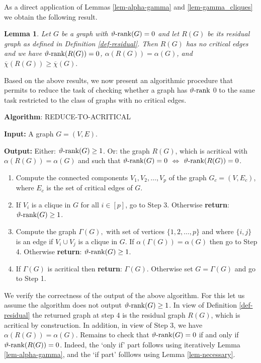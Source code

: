 \documentclass[11pt]{article}
\newtheorem{lemma}[theorem]{Lemma}
\numberwithin{equation}{section}
\newcommand{\rrank}{\vartheta\text{\rm -rank}}
\begin{document}
As a direct application of Lemmas \ref{lem-alpha-gamma} and \ref{lem-gamma_cliques} we obtain the following result.

\begin{lemma}\label{lem-residual}
Let $G$ be a graph with $\rrank(G)=0$ and let $R(G)$ be its residual graph as defined in Definition \ref{def-residual}. Then $R(G)$ has no critical edges and we have
$\rrank(R(G))=0$, $\alpha(R(G))=\alpha(G)$, and $\overline{\chi}(R(G))\geq \overline{\chi}(G).$
\end{lemma}

Based on the above  results,  we now present an algorithmic procedure that permits to reduce the task of checking whether a graph has $\rrank$ 0 to the same task restricted to the class of graphs with no critical edges. 

\medskip\noindent
\textbf{Algorithm}: REDUCE-TO-ACRITICAL

\smallskip\noindent
\textbf{Input:} A graph $G=(V,E)$.

\smallskip\noindent
\textbf{Output:} 
Either: $\rrank (G)\ge 1$. 
Or: the graph $R(G)$, which is acritical with $\alpha (R(G))= \alpha(G)$ and such that 
$\rrank (G)=0$ $\Longleftrightarrow$ $\rrank (R(G))=0$.
\begin{enumerate}
    \item Compute the connected components $V_1, V_2, \dots, V_p$ of the graph $G_c=(V,E_c)$, where $E_c$ is the set of critical edges of $G$. 
    \item If $V_i$ is a clique in $G$ for all $i\in [p]$, go to Step 3. Otherwise \textbf{return}:  $\rrank (G)\ge 1$.
    \item Compute the graph $\Gamma(G),$ with  set of vertices $\{1,2,\dots,p\}$ and where $\{i,j\}$ is an edge if $V_i\cup V_j$ is a clique in $G$. If 
    $\alpha(\Gamma(G))= \alpha(G)$ then go to Step 4. Otherwise  \textbf{return}: $\rrank (G) \ge 1$.
    \item If $\Gamma(G)$ is acritical then  \textbf{return}: $\Gamma(G)$.
    Otherwise  set $G=\Gamma(G)$ and go to Step 1. 
\end{enumerate}

We  verify the correctness of the output of the above algorithm. For this let us  assume the algorithm does not output $\rrank (G)\ge 1$.
In view of Definition \ref{def-residual}  the returned graph at step 4 is the residual graph $R(G)$, which is acritical by construction. In addition, in view of Step 3, we have $\alpha(R(G))= \alpha (G)$. Remains to check that $\rrank(G)=0$ if and only if $\rrank(R(G))=0$.  Indeed, the `only if' part follows using iteratively  Lemma \ref{lem-alpha-gamma}, and the `if part' folllows using 
Lemma \ref{lem-necessary}.
\end{document}
